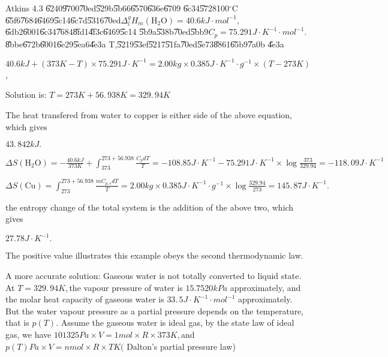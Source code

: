 \documentclass{article}
\begin{document}
Atkins 4.3 \U{6240}\U{9700}\U{70ed}\U{529b}\U{5b66}\U{6570}\U{636e}\U{6709}%
\U{6c34}\U{5728}100$%
{{}^\circ}%
$C \U{65f6}\U{7684}\U{6469}\U{5c14}\U{6c7d}\U{5316}\U{70ed}$\Delta
_{l}^{g}H_{m}\left( \text{H}_{2}\text{O}\right) =40.6\unit{kJ}\cdot \unit{mol%
}^{-1},$\U{6db2}\U{6001}\U{6c34}\U{7684}\U{8fd1}\U{4f3c}\U{6469}\U{5c14}%
\U{5b9a}\U{538b}\U{70ed}\U{5bb9}$C_{p}=75.291\unit{J}\cdot \unit{K}%
^{-1}\cdot \unit{mol}^{-1}.$\U{8bbe}\U{672b}\U{6001}\U{6e29}\U{5ea6}\U{4e3a}%
T,\U{5219}\U{53ef}\U{5217}\U{51fa}\U{70ed}\U{5e73}\U{8861}\U{65b9}\U{7a0b}%
\U{4e3a}\qquad

$40.6\unit{kJ}+\left( 373\unit{K}-T\right) \times 75.291\unit{J}\cdot \unit{K%
}^{-1}=2.00\unit{kg}\times 0.385\unit{J}\cdot \unit{K}^{-1}\cdot \unit{g}%
^{-1}\times \left( T-273\unit{K}\right) $,

Solution is: $T=273\unit{K}+56.\,\allowbreak 938\unit{K}=\allowbreak
329.\,\allowbreak 94\unit{K}$

The heat transfered from water to copper is either side of the above
equation, which gives

$\allowbreak 43.\,\allowbreak 842\unit{kJ}.$

$\Delta S\left( \text{H}_{2}\text{O}\right) =-\frac{40.6\unit{kJ}}{373\unit{K%
}}+\int_{373}^{273+56.938}\frac{C_{p}dT}{T}=-108.85\unit{J}\cdot \unit{K}%
^{-1}-75.291\unit{J}\cdot \unit{K}^{-1}\times \log \frac{373}{329.94}%
=\allowbreak -118.\,\allowbreak 09\unit{J}\cdot \unit{K}^{-1}$

$\Delta S\left( \text{Cu}\right) =\int_{273}^{273+56.938}\frac{mC_{p,s}dT}{T}%
=2.00\unit{kg}\times 0.385\unit{J}\cdot \unit{K}^{-1}\cdot \unit{g}%
^{-1}\times \log \frac{329.94}{273}=145.\,87\unit{J}\cdot \unit{K}^{-1}.$

the entropy change of the total system is the addition of the above two,
which gives

$27.78\unit{J}\cdot \unit{K}^{-1}.$

The positive value illustrates this example obeys the second thermodynamic
law.

\bigskip A more accurate solution: Gaseous water is not totally converted to
liquid state. At $T=\allowbreak 329.\,\allowbreak 94K,$the vapour pressure
of water is $15.7520\unit{kPa}$ approximately, and the molar heat capacity
of gaseous water is $\allowbreak 33.\,\allowbreak 5\unit{J}\cdot \unit{K}%
^{-1}\cdot \unit{mol}^{-1}$ approximately. But the water vapour pressure as
a partial pressure depends on the temperature, that is $p\left( T\right) .$%
Assume the gaseous water is ideal gas, by the state law of ideal gas, we
have $101325\unit{Pa}\times V=1\unit{mol}\times R\times 373\unit{K},$and $%
p\left( T\right) \unit{Pa}\times V=n\unit{mol}\times R\times T\unit{K}($%
Dalton's partial pressure law)
\end{document}
